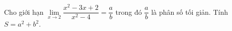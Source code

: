\begin{ex}
Cho giới hạn $\lim\limits_{x\to2}\dfrac{x^2-3x+2}{x^2-4}=\dfrac ab$ trong đó $\dfrac ab$ là phân số tối giản. Tính $S=a^2+b^2$.
\end{ex}

